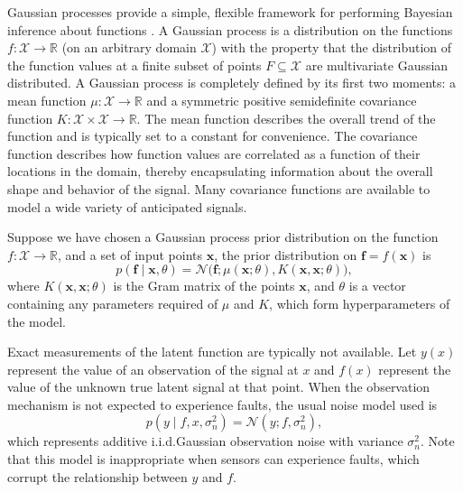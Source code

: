 \documentclass{article} %
\newcommand{\R}{\ensuremath{\mathbb{R}}}
\newcommand{\deq}{=}
\newcommand{\given}{\!\ensuremath{\mid}\!}
\newcommand{\cm}[1]{\ensuremath{\mathcal{#1}}}
\newcommand{\bm}[1]{\ensuremath{\mathbf{#1}}}
\begin{document}
Gaussian processes provide a simple, flexible framework for performing
Bayesian inference about functions \citep{gpml}.  A Gaussian process
is a distribution on the functions $f\colon \cm{X} \to \R$ (on an
arbitrary domain $\cm{X}$) with the property that the distribution of
the function values at a finite subset of points $F \subseteq \cm{X}$
are multivariate Gaussian distributed. A Gaussian process is completely defined by its first two moments: a
mean function $\mu\colon \cm{X} \to \R$ and a symmetric positive
semidefinite covariance function $K\colon \cm{X} \times \cm{X} \to
\R$.  The mean function describes the overall trend of the function
and is typically set to a constant for convenience.  The covariance
function describes how function values are correlated as a function of
their locations in the domain, thereby encapsulating information about
the overall shape and behavior of the signal.  Many covariance
functions are available to model a wide variety of anticipated
signals.

Suppose we have chosen a Gaussian process prior distribution on the
function $f\colon \cm{X} \to \R$, and a set of input points $\bm{x}$,
the prior distribution on $\bm{f} \deq f(\bm{x})$ is
\begin{equation*}
 p(\bm{f} \given \bm{x}, \theta)
 =
 \cm{N}
 \bigl(
   \bm{f};
   \mu(\bm{x}; \theta),
   K(\bm{x}, \bm{x}; \theta)
 \bigr),
\end{equation*}
where $K(\bm{x}, \bm{x}; \theta)$ is the Gram matrix of the points
$\bm{x}$, and $\theta$ is a vector containing any parameters required
of $\mu$ and $K$, which form hyperparameters of the model.

Exact measurements of the latent function are typically not available.
Let $y(x)$ represent the
value of an observation of the signal at $x$ and $f(x)$
represent the value of the unknown true latent signal at that point.
When the observation mechanism is not expected to experience faults,
the usual noise model used is
\begin{equation}\label{iidnoise}
 p(y \given f, x, \sigma_n^2)
 \deq
 \cm{N}(y; f, \sigma_n^2),
\end{equation}
which represents additive i.i.d.\space Gaussian observation noise with
variance $\sigma_n^2$. Note that this model is inappropriate when
sensors can experience faults, which corrupt the relationship
between $y$ and $f$.
\end{document}

